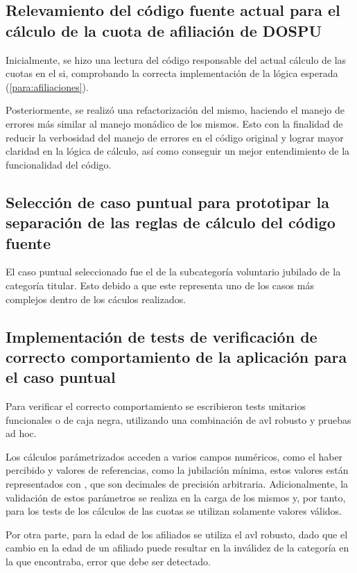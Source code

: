 \subsection{Relevamiento del código fuente actual para el cálculo de la cuota de afiliación de DOSPU}
Inicialmente, se hizo una lectura del código responsable del actual cálculo de las cuotas en el \acrshort{si}, comprobando la correcta implementación de la lógica esperada (\cref{para:afiliaciones}).

Posteriormente, se realizó una refactorización del mismo, haciendo el manejo de errores más similar al manejo monádico de los mismos. Esto con la finalidad de reducir la verbosidad del manejo de errores en el código original y lograr mayor claridad en la lógica de cálculo, así como conseguir un mejor entendimiento de la funcionalidad del código.

\subsection{Selección de caso puntual para prototipar la separación de las reglas de cálculo del código fuente}
El caso puntual seleccionado fue el de la subcategoría voluntario jubilado de la categoría titular. Esto debido a que este representa uno de los casos más complejos dentro de los cáculos realizados.

\subsection{Implementación de tests de verificación de correcto comportamiento de la aplicación para el caso puntual }\label{para:tests}
Para verificar el correcto comportamiento se escribieron tests unitarios funcionales o de caja negra, utilizando una combinación de \acrfull{avl} robusto y pruebas ad hoc.

Los cálculos parámetrizados acceden a varios campos numéricos, como el haber percibido y valores de referencias, como la jubilación mínima, estos valores están representados con , que son decimales de precisión arbitraria. Adicionalmente, la validación de estos parámetros se realiza en la carga de los mismos y, por tanto, para los tests de los cálculos de las cuotas se utilizan solamente valores válidos.

Por otra parte, para la edad de los afiliados se utiliza el \acrshort{avl} robusto, dado que el cambio en la edad de un afiliado puede resultar en la inválidez de la categoría en la que encontraba, error que debe ser detectado.


